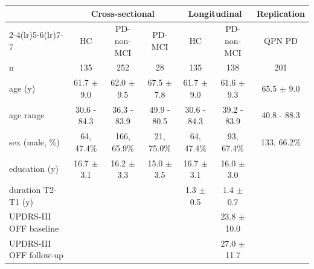 \begin{tabular}{lcccccc}
\toprule
 & \multicolumn{3}{c}{Cross-sectional} & \multicolumn{2}{c}{Longitudinal} & \multicolumn{1}{c}{Replication} \\
\cmidrule(lr){2-4}\cmidrule(lr){5-6}\cmidrule(lr){7-7}
 & HC & PD-non-MCI & PD-MCI & HC & PD-non-MCI & QPN PD \\
\midrule
n & 135 & 252 & 28 & 135 & 138 & 201 \\
age (y) & 61.7 $\pm$ 9.0 & 62.0 $\pm$ 9.5 & 67.5 $\pm$ 7.8 & 61.7 $\pm$ 9.0 & 61.6 $\pm$ 9.3 & 65.5 $\pm$ 9.0 \\
age range & 30.6 - 84.3 & 36.3 - 83.9 & 49.9 - 80.5 & 30.6 - 84.3 & 39.2 - 83.9 & 40.8 - 88.3 \\
sex (male, \%) & 64, 47.4\% & 166, 65.9\% & 21, 75.0\% & 64, 47.4\% & 93, 67.4\% & 133, 66.2\% \\
education (y) & 16.7 $\pm$ 3.1 & 16.2 $\pm$ 3.3 & 15.0 $\pm$ 3.5 & 16.7 $\pm$ 3.1 & 16.0 $\pm$ 3.0 &  \\
duration T2-T1 (y) &  &  &  & 1.3 $\pm$ 0.5 & 1.4 $\pm$ 0.7 &  \\
UPDRS-III OFF baseline &  &  &  &  & 23.8 $\pm$ 10.0 &  \\
UPDRS-III OFF follow-up &  &  &  &  & 27.0 $\pm$ 11.7 &  \\
\bottomrule
\end{tabular}
